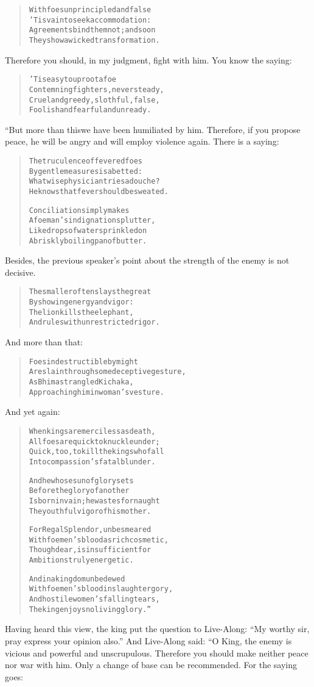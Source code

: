\documentclass[article, twoside, 14pt]{memoir}
\renewenvironment{verbatim}{%
\begin{quote}%
\vskip -10pt%
\begin{alltt}\normalfont\large}{\end{alltt}%
\end{quote}%
\vskip -10pt
} %
\begin{document}
\begin{verbatim}
With foes unprincipled and false
    'Tis vain to seek accommodation:
Agreements bind them not; and soon
    They show a wicked transformation.
\end{verbatim}
Therefore you should, in my judgment, fight with him. You know the
saying:

\begin{verbatim}
'Tis easy to uproot a foe
    Contemning fighters, never steady,
Cruel and greedy, slothful, false,
    Foolish and fearful and unready.
\end{verbatim}
“But more than this{\textemdash}we have been humiliated by him. Therefore, if
you propose peace, he will be angry and will employ violence again.
There is a saying:

\begin{verbatim}
The truculence of fevered foes
    By gentle measures is abetted:
What wise physician tries a douche?
    He knows that fever should be sweated.

Conciliation simply makes
    A foeman's indignation splutter,
Like drops of water sprinkled on
    A briskly boiling pan of butter.
\end{verbatim}
Besides, the previous speaker's point about the strength of the
enemy is not decisive.

\begin{verbatim}
The smaller often slays the great
    By showing energy and vigor:
The lion kills the elephant,
    And rules with unrestricted rigor.
\end{verbatim}
And more than that:

\begin{verbatim}
Foes indestructible by might
    Are slain through some deceptive gesture,
As Bhima strangled Kichaka,
    Approaching him in woman's vesture.
\end{verbatim}
And yet again:

\begin{verbatim}
When kings are merciless as death,
    All foes are quick to knuckle under;
Quick, too, to kill the kings who fall
    Into compassion's fatal blunder.

And he whose sun of glory sets
    Before the glory of another
Is born in vain; he wastes for naught
    The youthful vigor of his mother.

For Regal Splendor, unbesmeared
    With foemen's blood as rich cosmetic,
Though dear, is insufficient for
    Ambitions truly energetic.

And in a kingdom unbedewed
    With foemen's blood in slaughter gory,
And hostile women's falling tears,
    The king enjoys no living glory.”
\end{verbatim}
Having heard this view, the king put the question to Live-Along:
``My worthy sir, pray express your opinion also.'' And Live-Along
said: “O King, the enemy is vicious and powerful and
unscrupulous. Therefore you should make neither peace nor war with
him. Only a change of base can be recommended. For the saying
goes:
\end{document}
